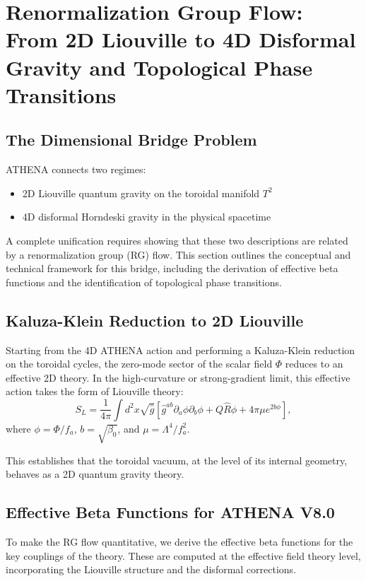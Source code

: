 \documentclass[11pt,a4paper]{article}
\begin{document}
\section{Renormalization Group Flow: From 2D Liouville to 4D Disformal Gravity and Topological Phase Transitions}

\subsection{The Dimensional Bridge Problem}
ATHENA connects two regimes:
\begin{itemize}
\item 2D Liouville quantum gravity on the toroidal manifold \(T^2\)
\item 4D disformal Horndeski gravity in the physical spacetime
\end{itemize}
A complete unification requires showing that these two descriptions are related by a renormalization group (RG) flow. This section outlines the conceptual and technical framework for this bridge, including the derivation of effective beta functions and the identification of topological phase transitions.

\subsection{Kaluza-Klein Reduction to 2D Liouville}
Starting from the 4D ATHENA action and performing a Kaluza-Klein reduction on the toroidal cycles, the zero-mode sector of the scalar field \(\Phi\) reduces to an effective 2D theory. In the high-curvature or strong-gradient limit, this effective action takes the form of Liouville theory:
\begin{equation}
S_{L} = \frac{1}{4\pi}\int d^{2}x\sqrt{\hat{g}}\left[\hat{g}^{ab}\partial_{a}\phi \partial_{b}\phi +Q\hat{R}\phi +4\pi \mu e^{2b\phi}\right], \tag{60}
\end{equation}
where \(\phi = \Phi /f_{a}\), \(b = \sqrt{\beta_0}\), and \(\mu = \Lambda^4 /f_a^2\).

This establishes that the toroidal vacuum, at the level of its internal geometry, behaves as a 2D quantum gravity theory.

\subsection{Effective Beta Functions for ATHENA V8.0}
To make the RG flow quantitative, we derive the effective beta functions for the key couplings of the theory. These are computed at the effective field theory level, incorporating the Liouville structure and the disformal corrections.
\end{document}
